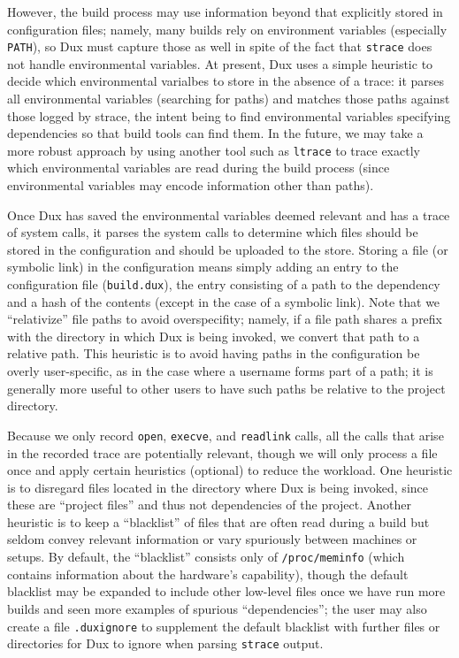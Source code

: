 \documentclass[10pt,conference]{IEEEtran}
\begin{document}
However, the build process may use information beyond that explicitly stored in configuration files; namely,
many builds rely on environment variables (especially \texttt{PATH}), so Dux must capture those as well
in spite of the fact that \texttt{strace} does not handle environmental variables. At present, Dux uses a
simple heuristic to decide which environmental varialbes to store in the absence of a trace: it parses
all environmental variables (searching for paths) and matches those paths against those logged by strace,
the intent being to find environmental variables specifying dependencies so that build tools can find them.
In the future, we may take a more robust approach by using another tool such as \texttt{ltrace} to trace
exactly which environmental variables are read during the build process (since environmental variables may
encode information other than paths).

Once Dux has saved the environmental variables deemed relevant and has a trace of system calls, it parses
the system calls to determine which files should be stored in the configuration and should be uploaded to
the store. Storing a file (or symbolic link) in the configuration means simply adding an entry to the
configuration file (\texttt{build.dux}), the entry consisting of a path to the dependency and a hash of the contents
(except in the case of a symbolic link). Note that we ``relativize'' file paths to avoid overspecifity; namely,
if a file path shares a prefix with the directory in which Dux is being invoked, we convert that path to
a relative path. This heuristic is to avoid having paths in the configuration be overly user-specific, as in the
case where a username forms part of a path; it is generally more useful to other users to have such paths be
relative to the project directory.

Because we only record \texttt{open}, \texttt{execve}, and \texttt{readlink} calls, all the
calls that arise in the recorded trace are potentially relevant, though we will only process a file once
and apply certain heuristics (optional) to reduce the workload. One heuristic is to disregard files located 
in the directory where Dux is being invoked, since these are ``project files'' and thus not dependencies
of the project. Another heuristic is to keep a ``blacklist'' of files that are often read during a build
but seldom convey relevant information or vary spuriously between machines or setups. By default, the
``blacklist'' consists only of \texttt{/proc/meminfo} (which contains information about the hardware's
capability), though the default blacklist may be expanded to include other low-level files once we have
run more builds and seen more examples of spurious ``dependencies''; the user may also create
a file \texttt{.duxignore} to supplement the default blacklist with further files or directories for
Dux to ignore when parsing \texttt{strace} output.
\end{document}
